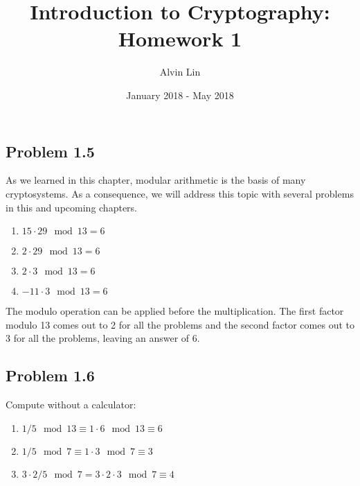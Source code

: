 \documentclass{math}
\title{Introduction to Cryptography: Homework 1}
\author{Alvin Lin}
\date{January 2018 - May 2018}
\begin{document}
\maketitle

\subsection*{Problem 1.5}
As we learned in this chapter, modular arithmetic is the basis of many
cryptosystems. As a consequence, we will address this topic with several
problems in this and upcoming chapters.
\begin{enumerate}
  \item \( 15\cdot29\mod13 = 6 \)
  \item \( 2\cdot29\mod13 = 6 \)
  \item \( 2\cdot3\mod13 = 6 \)
  \item \( -11\cdot3\mod13 = 6 \)
\end{enumerate}
The modulo operation can be applied before the multiplication. The first factor
modulo 13 comes out to 2 for all the problems and the second factor comes out to
3 for all the problems, leaving an answer of 6.

\subsection*{Problem 1.6}
Compute without a calculator:
\begin{enumerate}
  \item \( 1/5\mod13 \equiv 1\cdot6\mod13 \equiv 6 \)
  \item \( 1/5\mod7 \equiv 1\cdot3\mod7 \equiv 3 \)
  \item \( 3\cdot2/5\mod7 = 3\cdot2\cdot3\mod7 \equiv 4 \)
\end{enumerate}
\end{document}
